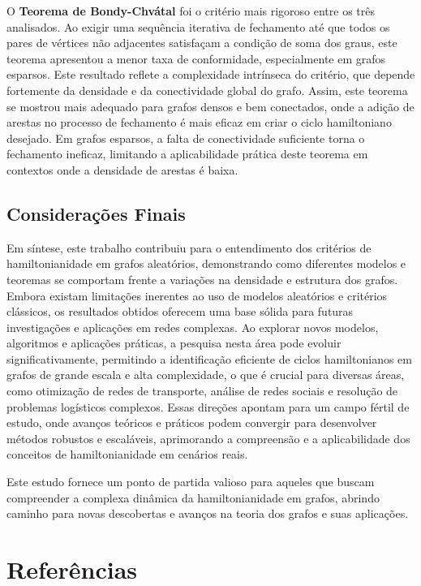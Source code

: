 \documentclass[12pt, openright, oneside, a4paper, chapter=TITLE, section=TITLE, subsection=TITLE, subsubsection=TITLE, brazil]{abntex2}
\begin{document}
O \textbf{Teorema de Bondy-Chvátal} foi o critério mais rigoroso entre os três analisados. Ao exigir uma sequência iterativa de fechamento até que todos os pares de vértices não adjacentes satisfaçam a condição de soma dos graus, este teorema apresentou a menor taxa de conformidade, especialmente em grafos esparsos. Este resultado reflete a complexidade intrínseca do critério, que depende fortemente da densidade e da conectividade global do grafo. Assim, este teorema se mostrou mais adequado para grafos densos e bem conectados, onde a adição de arestas no processo de fechamento é mais eficaz em criar o ciclo hamiltoniano desejado. Em grafos esparsos, a falta de conectividade suficiente torna o fechamento ineficaz, limitando a aplicabilidade prática deste teorema em contextos onde a densidade de arestas é baixa.

\section{Considerações Finais}

Em síntese, este trabalho contribuiu para o entendimento dos critérios de hamiltonianidade em grafos aleatórios, demonstrando como diferentes modelos e teoremas se comportam frente a variações na densidade e estrutura dos grafos. Embora existam limitações inerentes ao uso de modelos aleatórios e critérios clássicos, os resultados obtidos oferecem uma base sólida para futuras investigações e aplicações em redes complexas. Ao explorar novos modelos, algoritmos e aplicações práticas, a pesquisa nesta área pode evoluir significativamente, permitindo a identificação eficiente de ciclos hamiltonianos em grafos de grande escala e alta complexidade, o que é crucial para diversas áreas, como otimização de redes de transporte, análise de redes sociais e resolução de problemas logísticos complexos. Essas direções apontam para um campo fértil de estudo, onde avanços teóricos e práticos podem convergir para desenvolver métodos robustos e escaláveis, aprimorando a compreensão e a aplicabilidade dos conceitos de hamiltonianidade em cenários reais.

Este estudo fornece um ponto de partida valioso para aqueles que buscam compreender a complexa dinâmica da hamiltonianidade em grafos, abrindo caminho para novas descobertas e avanços na teoria dos grafos e suas aplicações.
\printindex

\chapter*{Referências}
\end{document}
